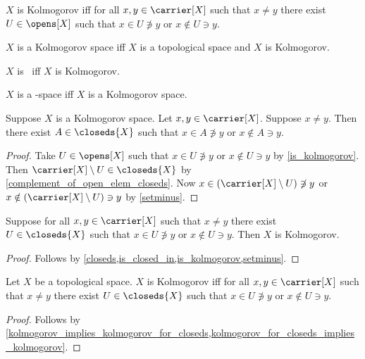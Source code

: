 


\begin{definition}\label{is_kolmogorov}
    $X$ is Kolmogorov iff
    for all $x,y\in\carrier[X]$ such that $x\neq y$
    there exist $U\in\opens[X]$ such that
    $x\in U\not\ni y$ or $x\notin U\ni y$.
\end{definition}

\begin{abbreviation}\label{kolmogorov_space}
    $X$ is a Kolmogorov space iff $X$ is a topological space and
    $X$ is Kolmogorov.
\end{abbreviation}

\begin{abbreviation}\label{teezero}
    $X$ is \teezero\ iff $X$ is Kolmogorov.
\end{abbreviation}

\begin{abbreviation}\label{teezero_space}
    $X$ is a \teezero-space iff $X$ is a Kolmogorov space.
\end{abbreviation}

\begin{proposition}\label{kolmogorov_implies_kolmogorov_for_closeds}
    Suppose $X$ is a Kolmogorov space.
    Let $x,y\in\carrier[X]$.
    Suppose $x\neq y$.
    Then there exist $A\in\closeds{X}$ such that
    $x\in A\not\ni y$ or $x\notin A\ni y$.
\end{proposition}
\begin{proof}
    Take $U\in\opens[X]$ such that $x\in U\not\ni y$ or $x\notin U\ni y$
        by \cref{is_kolmogorov}.
    Then $\carrier[X]\setminus U\in\closeds{X}$ by \cref{complement_of_open_elem_closeds}.
    Now $x\in (\carrier[X]\setminus U)\not\ni y$ or $x\notin (\carrier[X]\setminus U)\ni y$
        by \cref{setminus}.
\end{proof}

\begin{proposition}\label{kolmogorov_for_closeds_implies_kolmogorov}
    Suppose for all $x,y\in\carrier[X]$ such that $x\neq y$
        there exist $U\in\closeds{X}$ such that
        $x\in U\not\ni y$ or $x\notin U\ni y$.
    Then $X$ is Kolmogorov.
\end{proposition}
\begin{proof}
    Follows by \cref{closeds,is_closed_in,is_kolmogorov,setminus}.
\end{proof}

\begin{proposition}\label{kolmogorov_iff_kolmogorov_for_closeds}
    Let $X$ be a topological space.
    $X$ is Kolmogorov iff
    for all $x,y\in\carrier[X]$ such that $x\neq y$
    there exist $U\in\closeds{X}$ such that
    $x\in U\not\ni y$ or $x\notin U\ni y$.
\end{proposition}
\begin{proof}
    Follows by \cref{kolmogorov_implies_kolmogorov_for_closeds,kolmogorov_for_closeds_implies_kolmogorov}.
\end{proof}


